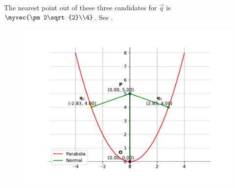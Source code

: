     The nearest point out of these three candidates for $\vec{q}$ is
    $\myvec{\pm2\sqrt{2}\\4}$. 
See .
\begin{figure}[H]
        \centering
        \includegraphics[width=0.75\columnwidth]{chapters/12/6/5/27/figs/fig.pdf}
        \caption{}
        \label{fig:chapters/12/6/5/27/normal}
    \end{figure}
